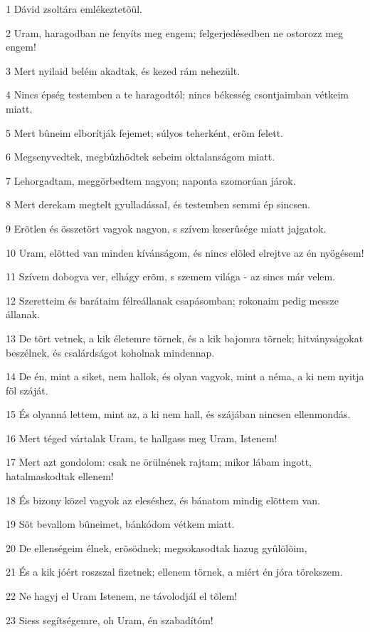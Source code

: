 \par 1 Dávid zsoltára emlékeztetõül.
\par 2 Uram, haragodban ne fenyíts meg engem; felgerjedésedben ne ostorozz meg engem!
\par 3 Mert nyilaid belém akadtak, és kezed rám nehezült.
\par 4 Nincs épség testemben a te haragodtól; nincs békesség csontjaimban vétkeim miatt.
\par 5 Mert bûneim elborítják fejemet; súlyos teherként, erõm felett.
\par 6 Megsenyvedtek, megbûzhödtek sebeim oktalanságom miatt.
\par 7 Lehorgadtam, meggörbedtem nagyon; naponta szomorúan járok.
\par 8 Mert derekam megtelt gyulladással, és testemben semmi ép sincsen.
\par 9 Erõtlen és összetört vagyok nagyon, s szívem keserûsége miatt jajgatok.
\par 10 Uram, elõtted van minden kívánságom, és nincs elõled elrejtve az én nyögésem!
\par 11 Szívem dobogva ver, elhágy erõm, s szemem világa - az sincs már velem.
\par 12 Szeretteim és barátaim félreállanak csapásomban; rokonaim pedig messze állanak.
\par 13 De tõrt vetnek, a kik életemre törnek, és a kik bajomra törnek; hitványságokat beszélnek, és csalárdságot koholnak mindennap.
\par 14 De én, mint a siket, nem hallok, és olyan vagyok, mint a néma, a ki nem nyitja föl száját.
\par 15 És olyanná lettem, mint az, a ki nem hall, és szájában nincsen ellenmondás.
\par 16 Mert téged vártalak Uram, te hallgass meg Uram, Istenem!
\par 17 Mert azt gondolom: csak ne örülnének rajtam; mikor lábam ingott, hatalmaskodtak ellenem!
\par 18 És bizony közel vagyok az eleséshez, és bánatom mindig elõttem van.
\par 19 Sõt bevallom bûneimet, bánkódom vétkem miatt.
\par 20 De ellenségeim élnek, erõsödnek; megsokasodtak hazug gyûlölõim,
\par 21 És a kik jóért roszszal fizetnek; ellenem törnek, a miért én jóra törekszem.
\par 22 Ne hagyj el Uram Istenem, ne távolodjál el tõlem!
\par 23 Siess segítségemre, oh Uram, én szabadítóm!


